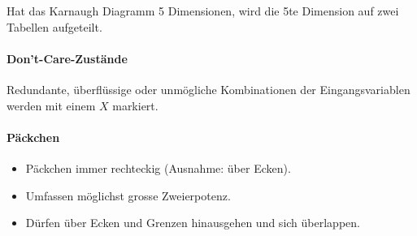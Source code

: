 \begin{center}
\begin{minipage}{0.45\linewidth}
\begin{center}
        \end{center}
    \end{minipage}
\end{center}
{\small Hat das Karnaugh Diagramm 5 Dimensionen, wird die 5te Dimension auf zwei Tabellen aufgeteilt.}
\paragraph{Don't-Care-Zustände} 
Redundante, überflüssige oder unmögliche Kombinationen der Eingangsvariablen werden mit einem \emph{$X$} markiert.

\paragraph{Päckchen}
\begin{itemize}
    \item Päckchen immer rechteckig (Ausnahme: über Ecken).
    \item Umfassen möglichst grosse Zweierpotenz.
    \item Dürfen über Ecken und Grenzen hinausgehen und sich überlappen.
\end{itemize}

